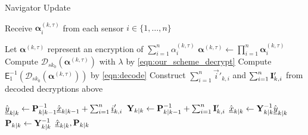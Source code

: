 \documentclass[10pt,letterpaper,oneside,twocolumn,journal]{IEEEtran}
\theoremstyle{definition}
\theoremstyle{definition}
\theoremstyle{remark}
\begin{document}
\begin{algorithm}[htbp]
\caption{Navigator Update}\label{alg:nav_update}
\begin{algorithmic}[1]
    
        \State Receive $\bm{\alpha}_{i}^{(k,\tau)}$ from each sensor $i\in\{1,\dots,n\}$
    \EndFor

    \State Let $\bm{\alpha}^{(k,\tau)}$ represent an encryption of $\sum_{i=1}^n\alpha_{i}^{(k,\tau)}$
        \State $\bm{\alpha}^{(k,\tau)} \gets \prod_{i=1}^n\bm{\alpha}_{i}^{(k,\tau)}$
        \State Compute $\mathcal{D}_{sk_0}(\bm{\alpha}^{(k,\tau)})$ with $\lambda$ by \eqref{eqn:our_scheme_decrypt}
        \State Compute $\mathsf{E}^{-1}_{1}(\mathcal{D}_{sk_0}(\bm{\alpha}^{(k,\tau)}))$ by \eqref{eqn:decode}
    \EndFor
    \State Construct $\sum_{i=1}^n\vec{i}'_{k,i}$ and $\sum_{i=1}^n{{\mathbf{I}}}'_{k,i}$ from decoded decryptions above

    \State $\hat{{\underline{y}}}_{k|k} \gets {\ensuremath{{\mathbf{P}}}}_{k|k-1}^{-1}\hat{{\underline{x}}}_{k|k-1} + \sum_{i=1}^n{\underline{i}}'_{k,i}$
    \State ${{\mathbf{Y}}}_{k|k} \gets {\ensuremath{{\mathbf{P}}}}_{k|k-1}^{-1} + \sum_{i=1}^n{{\mathbf{I}}}'_{k,i}$
    \State $\hat{{\underline{x}}}_{k|k} \gets {\ensuremath{{\mathbf{Y}}}}_{k|k}^{-1}\hat{{\underline{y}}}_{k|k}$
    \State ${{\mathbf{P}}}_{k|k} \gets {\ensuremath{{\mathbf{Y}}}}_{k|k}^{-1}$
    \State \Return $\hat{{\underline{x}}}_{k|k}, {{\mathbf{P}}}_{k|k}$
    \EndProcedure
\end{algorithmic}
\end{algorithm}
\end{document}
